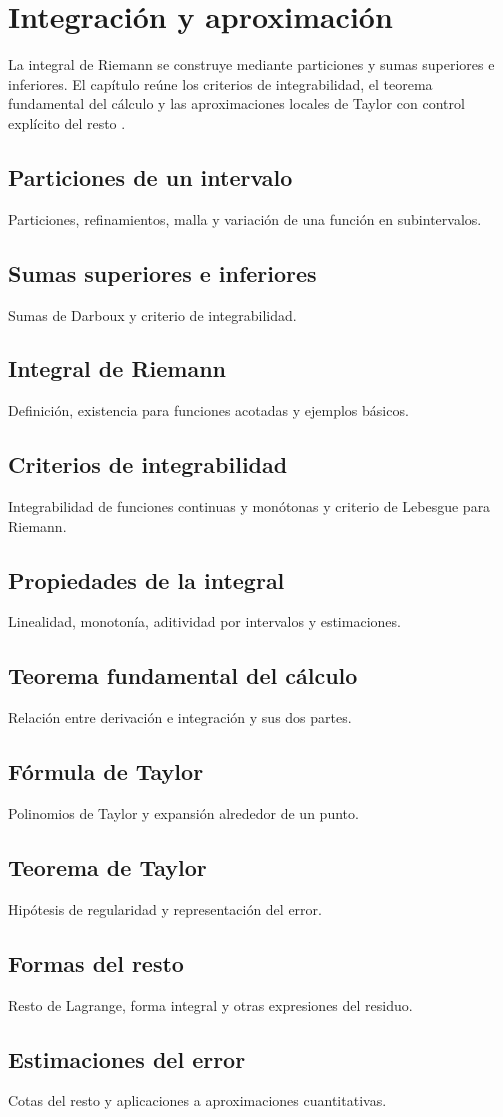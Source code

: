 \chapter{Integración y aproximación}
\label{cap:integracion-aproximacion}

La integral de Riemann se construye mediante particiones y sumas superiores e inferiores. El capítulo reúne los criterios de integrabilidad, el teorema fundamental del cálculo y las aproximaciones locales de Taylor con control explícito del resto \cite{apostol1974,spivak2008,rudin1976}.

\section{Particiones de un intervalo}
Particiones, refinamientos, malla y variación de una función en subintervalos.

\section{Sumas superiores e inferiores}
Sumas de Darboux y criterio de integrabilidad.

\section{Integral de Riemann}
Definición, existencia para funciones acotadas y ejemplos básicos.

\section{Criterios de integrabilidad}
Integrabilidad de funciones continuas y monótonas y criterio de Lebesgue para Riemann.

\section{Propiedades de la integral}
Linealidad, monotonía, aditividad por intervalos y estimaciones.

\section{Teorema fundamental del cálculo}
Relación entre derivación e integración y sus dos partes.

\section{Fórmula de Taylor}
Polinomios de Taylor y expansión alrededor de un punto.

\section{Teorema de Taylor}
Hipótesis de regularidad y representación del error.

\section{Formas del resto}
Resto de Lagrange, forma integral y otras expresiones del residuo.

\section{Estimaciones del error}
Cotas del resto y aplicaciones a aproximaciones cuantitativas.
